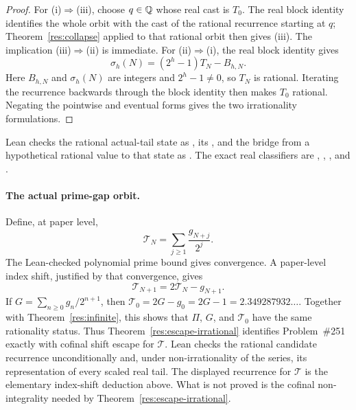 \documentclass[11pt]{article}
\begin{document}
\begin{proof}
For \textup{(i)}$\Rightarrow$\textup{(iii)}, choose $q\in\mathbb{Q}$ whose real cast
is $T_0$.  The real block identity identifies the whole orbit with the cast of
the rational recurrence starting at $q$; Theorem~\ref{res:collapse} applied to
that rational orbit then gives \textup{(iii)}.  The implication
\textup{(iii)}$\Rightarrow$\textup{(ii)} is immediate.  For
\textup{(ii)}$\Rightarrow$\textup{(i)}, the real block identity gives
\[
 \sigma_h(N)=(2^h-1)T_N-B_{h,N}.
\]
Here $B_{h,N}$ and $\sigma_h(N)$ are integers and $2^h-1\ne0$, so $T_N$ is
rational.  Iterating the recurrence backwards through the block identity then
makes $T_0$ rational.  Negating the pointwise and eventual forms gives the two
irrationality formulations.
\end{proof}

\noindent Lean checks the rational actual-tail state as
, its
,
and the bridge from a hypothetical rational value to that state as
.  The exact real classifiers are
,
,
, and
.

\paragraph{The actual prime-gap orbit.}
Define, at paper level,
\[
 \mathcal T_N=\sum_{j\ge1}\frac{g_{N+j}}{2^j}.
\]
The Lean-checked polynomial prime bound gives convergence.  A paper-level
index shift, justified by that convergence, gives
\[
 \mathcal T_{N+1}=2\mathcal T_N-g_{N+1}.
\]
If $G=\sum_{n\ge0}g_n/2^{n+1}$, then
$\mathcal T_0=2G-g_0=2G-1=2.349287932\ldots$.  Together with
Theorem~\ref{res:infinite}, this shows that $\Pi$, $G$, and
$\mathcal T_0$ have the same rationality status.  Thus
Theorem~\ref{res:escape-irrational} identifies Problem~\#251 exactly with
cofinal shift escape for $\mathcal T$.  Lean checks the rational candidate
recurrence unconditionally and, under non-irrationality of the series, its
representation of every scaled real tail.  The displayed recurrence for
$\mathcal T$ is the elementary index-shift deduction above.  What is not
proved is the cofinal non-integrality needed by
Theorem~\ref{res:escape-irrational}.
\end{document}

